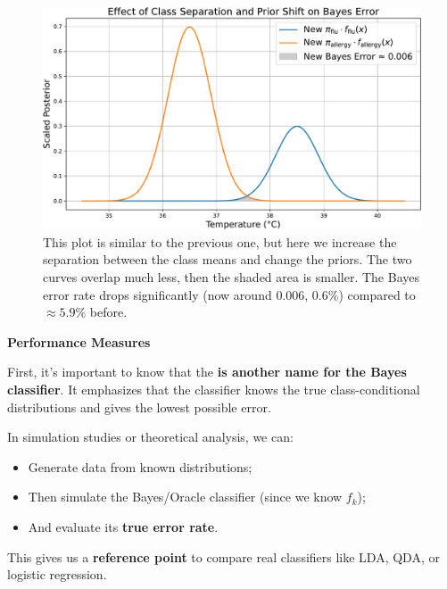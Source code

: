 \begin{figure}[!htp]
    \centering
    \includegraphics[width=\textwidth]{img/bayes-classifier/bayes-error-rate-almost-zero.pdf}
    \caption{This plot is similar to the previous one, but here we increase the separation between the class means and change the priors. The two curves overlap much less, then the shaded area is smaller. The Bayes error rate drops significantly (now around $0.006$, $0.6\%$) compared to $\approx 5.9\%$ before.}
\end{figure}

\newpage

\begin{flushleft}
    \textcolor{Green3}{\faIcon{\speedIcon} \textbf{Performance Measures}}
\end{flushleft}
First, it's important to know that the  \textbf{is another name for the Bayes classifier}. It emphasizes that the classifier knows the true class-conditional distributions and gives the lowest possible error.

\highspace
In simulation studies or theoretical analysis, we can:
\begin{itemize}
    \item Generate data from known distributions;
    \item Then simulate the Bayes/Oracle classifier (since we know $f_k$);
    \item And evaluate its \textbf{true error rate}.
\end{itemize}
This gives us a \textbf{reference point} to compare real classifiers like LDA, QDA, or logistic regression.

